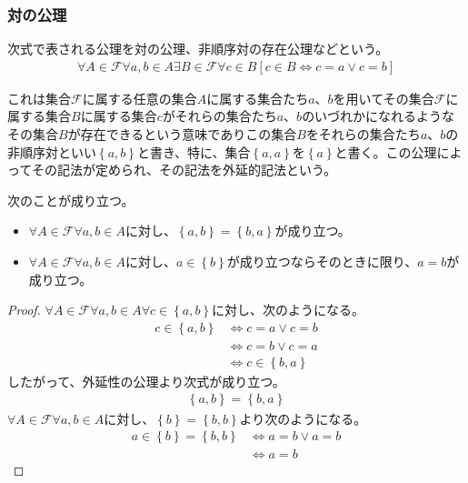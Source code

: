 \documentclass[a4paper]{jsarticle}
\begin{document}
\subsubsection{対の公理}%
\begin{axs} 
次式で表される公理を対の公理、非順序対の存在公理などという。
\begin{align*}
\forall A\in \mathcal{F} \forall a,b \in A\exists B\in \mathcal{F} \forall c \in B[ c \in B \Leftrightarrow c = a \vee c = b]
\end{align*}
\end{axs}
これは集合$\mathcal{F}$に属する任意の集合$A$に属する集合たち$a$、$b$を用いてその集合$\mathcal{F}$に属する集合$B$に属する集合$c$がそれらの集合たち$a$、$b$のいづれかになれるようなその集合$B$が存在できるという意味でありこの集合$B$をそれらの集合たち$a$、$b$の非順序対といい$\left\{ a,b \right\}$と書き、特に、集合$\left\{ a,a \right\}$を$\left\{ a \right\}$と書く。この公理によってその記法が定められ、その記法を外延的記法という。
\begin{thm}
\label{1.2.1.3}
次のことが成り立つ。
\begin{itemize}
\item
  $\forall A\in \mathcal{F} \forall a,b \in A$に対し、$\left\{ a,b \right\} = \left\{ b,a \right\}$が成り立つ。
\item
  $\forall A\in \mathcal{F} \forall a,b \in A$に対し、$a \in \left\{ b \right\}$が成り立つならそのときに限り、$a = b$が成り立つ。
\end{itemize}
\end{thm}
\begin{proof}
$\forall A\in \mathcal{F} \forall a,b \in A\forall c \in \left\{ a,b \right\}$に対し、次のようになる。
\begin{align*}
c \in \left\{ a,b \right\} &\Leftrightarrow c = a \vee c = b \\ 
&\Leftrightarrow c = b \vee c = a \\
&\Leftrightarrow c \in \left\{ b,a \right\}
\end{align*}
したがって、外延性の公理より次式が成り立つ。
\begin{align*}
\left\{ a,b \right\} = \left\{ b,a \right\}
\end{align*}
$\forall A\in \mathcal{F} \forall a,b \in A$に対し、$\left\{ b \right\} = \left\{ b,b \right\}$より次のようになる。
\begin{align*}
a \in \left\{ b \right\} = \left\{ b,b \right\} &\Leftrightarrow a = b \vee a = b \\ 
&\Leftrightarrow a = b
\end{align*}
\end{proof}
\end{document}
